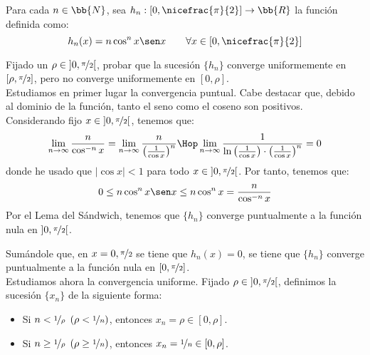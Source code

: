 \begin{ejercicio}
    Para cada $n\in \bb{N}$, sea $h_n:\left[0,\nicefrac{\pi}{2}\right]\to \bb{R}$ la función definida como:
    \begin{equation*}
        h_n(x) = n\cos^n x \sen x \qquad \forall x\in \left[0,\nicefrac{\pi}{2}\right]
    \end{equation*}

    Fijado un $\rho\in \left]0,\nicefrac{\pi}{2}\right[$, probar que la sucesión $\{h_n\}$ converge uniformemente en $[\rho,\nicefrac{\pi}{2}]$, pero no converge uniformemente en $\left[0,\rho\right]$.\\


    Estudiamos en primer lugar la convergencia puntual. Cabe destacar que, debido al 
    dominio de la función, tanto el seno como el coseno son positivos.
    Considerando fijo $x\in \left]0,\nicefrac{\pi}{2}\right[$, tenemos que:
    \begin{equation*}
        \lim_{n\to \infty} \frac{n}{\cos^{-n} x}
        = \lim_{n\to \infty} \frac{n}{\left(\frac{1}{\cos x}\right)^n}
        \Hop
        \lim_{n\to \infty} \frac{1}{\ln \left(\frac{1}{\cos x}\right)\cdot \left(\frac{1}{\cos x}\right)^{n}} = 0
    \end{equation*}
    donde he usado que $|\cos x|<1$ para todo $x\in \left]0,\nicefrac{\pi}{2}\right[$. Por tanto, tenemos que:
    \begin{equation*}
        0 \leq n\cos^n x \sen x \leq n\cos^n x = \frac{n}{\cos^{-n} x}
    \end{equation*}
    Por el Lema del Sándwich, tenemos que $\{h_n\}$ converge puntualmente a la función nula en $\left]0,\nicefrac{\pi}{2}\right[$.
    
    Sumándole que, en $x=0,\nicefrac{\pi}{2}$ se tiene que $h_n(x)=0$, se tiene que $\{h_n\}$ converge puntualmente a la función nula en $\left[0,\nicefrac{\pi}{2}\right]$.\\

    Estudiamos ahora la convergencia uniforme. Fijado $\rho\in \left]0,\nicefrac{\pi}{2}\right[$, definimos la sucesión $\{x_n\}$ de la siguiente forma:
    \begin{itemize}
        \item Si $n < \nicefrac{1}{\rho}~\left(\rho < \nicefrac{1}{n}\right)$, entonces $x_n = \rho \in [0, \rho]$.
        \item Si $n \geq \nicefrac{1}{\rho}~\left(\rho \geq \nicefrac{1}{n}\right)$, entonces $x_n = \nicefrac{1}{n}\in [0, \rho]$.
    \end{itemize}


\end{ejercicio}

